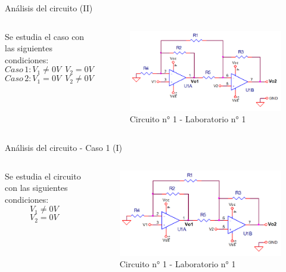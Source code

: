 \documentclass[14pt, aspectratio= 169]{beamer}
\begin{document}
\begin{frame}{Análisis del circuito (II)}
    \begin{columns}
         Se estudia el caso con las siguientes condiciones:
        $$ Caso \, 1: V_{1}\neq 0V \, \, \, V_{2}=0V $$ 
        $$ Caso \, 2: V_{1}= 0V \, \, \, V_{2}\neq 0V $$
        \begin{figure}
        \centering
        \includegraphics[width=1.0\linewidth]{img/Circuito 1.png}
        \caption{Circuito n° 1 - Laboratorio n° 1}
        \label{fig:enter-label}
    \end{figure}
    \end{columns}
\end{frame}

\begin{frame}{Análisis del circuito - Caso 1 (I)}
    \begin{columns}
         Se estudia el circuito con las siguientes condiciones:
        $$ V_{1}\neq 0V $$ $$ V_{2}=0V $$
        \begin{figure}
        \centering
        \includegraphics[width=1.0\linewidth]{img/Circuito 1.png}
        \caption{Circuito n° 1 - Laboratorio n° 1}
        \label{fig:enter-label}
    \end{figure}
    \end{columns}
\end{frame}
\end{document}
